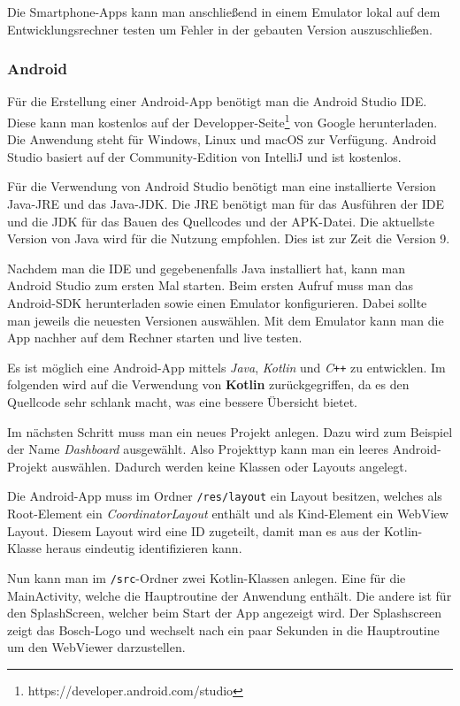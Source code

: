 Die Smartphone-Apps kann man anschließend in einem Emulator lokal auf dem Entwicklungsrechner testen um Fehler in der
gebauten Version auszuschließen.

\subsubsection{Android}
Für die Erstellung einer Android-App benötigt man die Android Studio IDE. Diese kann man kostenlos auf der
Developper-Seite\footnote{https://developer.android.com/studio} von Google herunterladen. Die Anwendung steht für
Windows, Linux und macOS zur Verfügung. Android Studio basiert auf der Community-Edition von IntelliJ und ist kostenlos.

Für die Verwendung von Android Studio benötigt man eine installierte Version Java-JRE und das Java-JDK. Die JRE benötigt
man für das Ausführen der IDE und die JDK für das Bauen des Quellcodes und der APK-Datei. Die aktuellste Version von
Java wird für die Nutzung empfohlen. Dies ist zur Zeit die Version 9.

Nachdem man die IDE und gegebenenfalls Java installiert hat, kann man Android Studio zum ersten Mal starten. Beim ersten
Aufruf muss man das Android-SDK herunterladen sowie einen Emulator konfigurieren. Dabei sollte man jeweils die neuesten
Versionen auswählen. Mit dem Emulator kann man die App nachher auf dem Rechner starten und live testen.

Es ist möglich eine Android-App mittels \textit{Java}, \textit{Kotlin} und \textit{C\texttt{++}} zu entwicklen. Im
folgenden wird auf die Verwendung von \textbf{Kotlin} zurückgegriffen, da es den Quellcode sehr schlank macht, was eine
bessere Übersicht bietet.

Im nächsten Schritt muss man ein neues Projekt anlegen. Dazu wird zum Beispiel der Name \textit{Dashboard} ausgewählt.
Also Projekttyp kann man ein leeres Android-Projekt auswählen. Dadurch werden keine Klassen oder Layouts angelegt.

Die Android-App muss im Ordner \texttt{/res/layout} ein Layout besitzen, welches als Root-Element ein
\textit{CoordinatorLayout} enthält und als Kind-Element ein WebView Layout. Diesem Layout wird eine ID zugeteilt, damit
man es aus der Kotlin-Klasse heraus eindeutig identifizieren kann.

Nun kann man im \texttt{/src}-Ordner zwei Kotlin-Klassen anlegen. Eine für die MainActivity, welche die Hauptroutine der
Anwendung enthält. Die andere ist für den SplashScreen, welcher beim Start der App angezeigt wird. Der Splashscreen
zeigt das Bosch-Logo und wechselt nach ein paar Sekunden in die Hauptroutine um den WebViewer darzustellen.

